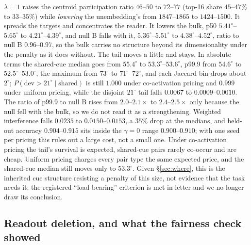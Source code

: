 \documentclass{article}
\newcommand{\degr}{^{\circ}}
\begin{document}
$\lambda{=}1$ raises the centroid participation ratio $46$--$50$ to $72$--$77$
(top-16 share $45$--$47\%$ to $33$--$35\%$) while \emph{lowering} the unembedding's
from $1847$--$1865$ to $1424$--$1500$. It spreads the targets and concentrates the
reader. It lowers the bulk, p50 $5.41\degr$--$5.65\degr$ to $4.21\degr$--$4.39\degr$,
and null B falls with it, $5.36\degr$--$5.51\degr$ to $4.38\degr$--$4.52\degr$,
ratio to null B $0.96$--$0.97$, so the bulk carries no structure beyond its
dimensionality under the penalty as it does without. The tail moves a little and
stays. In absolute terms the shared-cue median goes from $55.4\degr$ to
$53.3\degr$--$53.6\degr$, p99.9 from $54.6\degr$ to $52.5\degr$--$53.0\degr$, the
maximum from $73\degr$ to $71\degr$--$72\degr$, and each Jaccard bin drops about
$2\degr$; $P(\text{dev}>21\degr\mid\text{shared})$ is still $1.000$ under
co-activation pricing and $0.999$ under uniform pricing, while the disjoint
$21\degr$ tail falls $0.0067$ to $0.0009$--$0.0010$. The ratio of p99.9 to null B
rises from $2.0$--$2.1\times$ to $2.4$--$2.5\times$ only because the null fell with
the bulk, so we do not read it as a strengthening. Weighted interference falls
$0.0235$ to $0.0150$--$0.0153$, a $35\%$ drop at the medians, and held-out
accuracy $0.904$--$0.915$ sits inside the $\gamma{=}0$ range $0.900$--$0.910$;
with one seed per pricing this rules out a large cost, not a small one. Under
co-activation pricing the tail's survival is expected, shared-cue pairs rarely
co-occur and are cheap. Uniform pricing charges every pair type the same expected
price, and the shared-cue median still moves only to $53.3\degr$. Given
\S\ref{sec:where}, this is the inherited cue structure resisting a penalty of this
size, not evidence that the task needs it; the registered ``load-bearing''
criterion is met in letter and we no longer draw its conclusion.

\subsection{Readout deletion, and what the fairness check showed}\label{sec:ablate}
\end{document}
